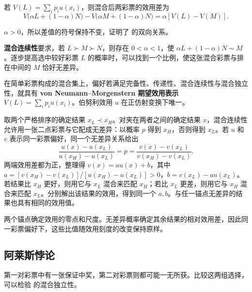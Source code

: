 \begin{solution}[label-content={证明},blank-type=none]
若 $V(L)=\sum_i p_i u(x_i)$，则混合后两彩票的效用差为
\[
 V\bigl(\alpha L+(1-\alpha)N\bigr)
 -V\bigl(\alpha M+(1-\alpha)N\bigr)
 =\alpha[V(L)-V(M)].
\]

$\alpha>0$，所以差值的符号保持不变，证明了 的双向关系。
\end{solution}

\textbf{混合连续性}要求，若 $L\succ M\succ N$，则存在 $0<\alpha<1$，使 $\alpha L+(1-\alpha)N\sim M$。逐步提高选中较好彩票 $L$ 的概率时，可以找到一个比例，使这张混合彩票与排在中间的 $M$ 恰好无差异。
\begin{tcolorbox}[knowledge,title=期望效用表示定理：彩票形式]
在简单彩票构成的混合集上，偏好若满足完备性、传递性、混合连续性与混合独立性，就具有 \textbf{von Neumann--Morgenstern 期望效用表示} $V(L)=\sum_i p_i u(x_i)$。伯努利效用 $u$ 在正仿射变换下唯一。
\end{tcolorbox}


\begin{solution}[label-content={证明（伯努利效用的正仿射唯一性）},blank-type=none]
取两个严格排序的确定结果 $x_L\prec x_H$。对夹在两者之间的确定结果 $x$，混合连续性允许用一张二点彩票与它配成无差异：以概率 $p$ 得到 $x_H$，否则得到 $x_L$。若 $u$ 和 $v$ 表示同一彩票偏好，同一个无差异关系给出
\[
 \frac{u(x)-u(x_L)}{u(x_H)-u(x_L)}
 =p=\frac{v(x)-v(x_L)}{v(x_H)-v(x_L)}.
\]
两端效用差都为正，整理得 $v(x)=au(x)+b$，其中 $a=[v(x_H)-v(x_L)]/[u(x_H)-u(x_L)]>0$，$b=v(x_L)-au(x_L)$。若结果比 $x_H$ 更好，则用它与 $x_L$ 混合来匹配 $x_H$；若比 $x_L$ 更差，则用它与 $x_H$ 混合来匹配 $x_L$。分别解出该结果的效用，得到同一个 $a,b$。与任一锚点无差异的结果也具有相同的效用值。
\end{solution}

两个锚点确定效用的零点和尺度。无差异概率确定其余结果的相对效用差，因此同一彩票偏好下，这些比值随效用刻度的改变保持原样。

\subsection{阿莱斯悖论}\label{sec:wj-six-allais}
第一对彩票中有一张保证中奖，第二对彩票则都可能一无所获。比较这两组选择，可以检验 的混合独立性。


